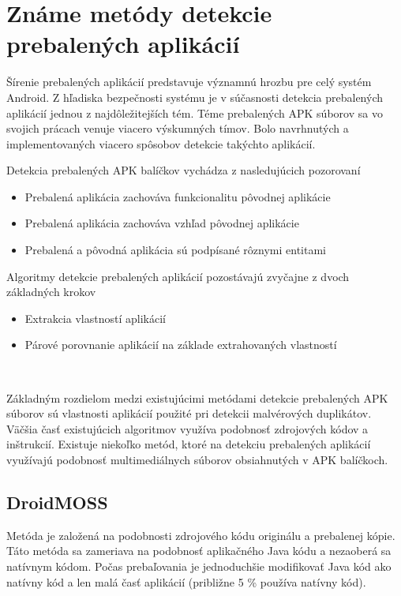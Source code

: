 \chapter{Známe metódy detekcie prebalených aplikácií}
\label{chap:zname-metody}
Šírenie prebalených aplikácií predstavuje významnú hrozbu pre celý systém Android. Z hľadiska bezpečnosti systému je v súčasnosti detekcia prebalených aplikácií jednou z najdôležitejších tém.
Téme prebalených APK súborov sa vo svojich prácach venuje viacero výskumných tímov. Bolo navrhnutých a implementovaných viacero spôsobov detekcie takýchto aplikácií. 
\newline 

\noindent Detekcia prebalených APK balíčkov vychádza z nasledujúcich pozorovaní
\begin{itemize}
	\item Prebalená aplikácia zachováva funkcionalitu pôvodnej aplikácie
	\item Prebalená aplikácia zachováva vzhľad pôvodnej aplikácie
	\item Prebalená a pôvodná aplikácia sú podpísané rôznymi entitami
\end{itemize} 

\noindent Algoritmy detekcie prebalených aplikácií pozostávajú zvyčajne z dvoch základných krokov
\begin{itemize}
	\item Extrakcia vlastností aplikácií
	\item Párové porovnanie aplikácií na základe extrahovaných vlastností
\end{itemize}
\ \newline

\noindent Základným rozdielom medzi existujúcimi metódami detekcie prebalených APK súborov sú vlastnosti aplikácií použité pri detekcii malvérových duplikátov. Väčšia časť existujúcich algoritmov využíva podobnosť zdrojových kódov a inštrukcií. Existuje niekoľko metód, ktoré na detekciu prebalených aplikácií využívajú podobnosť multimediálnych súborov obsiahnutých v APK balíčkoch.

\section{DroidMOSS}
Metóda  je založená na podobnosti zdrojového kódu originálu a prebalenej kópie. Táto metóda sa zameriava na podobnosť aplikačného Java kódu a nezaoberá sa natívnym kódom. Počas prebaľovania je jednoduchšie modifikovať Java kód ako natívny kód a len malá časť aplikácií (približne 5 \% používa natívny kód).


